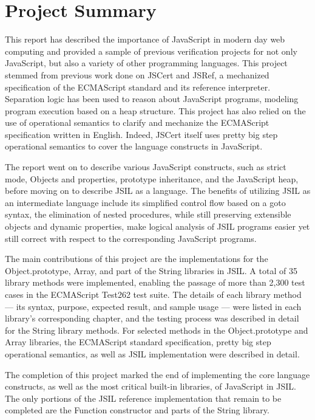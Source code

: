 \documentclass[a4paper,11pt,twoside]{report}
\begin{document}
\section{Project Summary}
This report has described the importance of JavaScript in modern day web computing and provided a sample of previous verification projects for not only JavaScript, but also a variety of other programming languages. This project stemmed from previous work done on JSCert and JSRef, a mechanized specification of the ECMAScript standard and its reference interpreter. Separation logic has been used to reason about JavaScript programs, modeling program execution based on a heap structure. This project has also relied on the use of operational semantics to clarify and mechanize the ECMAScript specification written in English. Indeed, JSCert itself uses pretty big step operational semantics to cover the language constructs in JavaScript. 

The report went on to describe various JavaScript constructs, such as strict mode, Objects and properties, prototype inheritance, and the JavaScript heap, before moving on to describe JSIL as a language. The benefits of utilizing JSIL as an intermediate language include its simplified control flow based on a goto syntax, the elimination of nested procedures, while still preserving extensible objects and dynamic properties, make logical analysis of JSIL programs easier yet still correct with respect to the corresponding JavaScript programs.

The main contributions of this project are the implementations for the Object.prototype, Array, and part of the String libraries in JSIL. A total of 35 library methods were implemented, enabling the passage of more than 2,300 test cases in the ECMAScript Test262 test suite. The details of each library method --- its syntax, purpose, expected result, and sample usage --- were listed in each library's corresponding chapter, and the testing process was described in detail for the String library methods. For selected methods in the Object.prototype and Array libraries, the ECMAScript standard specification, pretty big step operational semantics, as well as JSIL implementation were described in detail. 

The completion of this project marked the end of implementing the core language constructs, as well as the most critical built-in libraries, of JavaScript in JSIL. The only portions of the JSIL reference implementation that remain to be completed are the Function constructor and parts of the String library.
\end{document}
